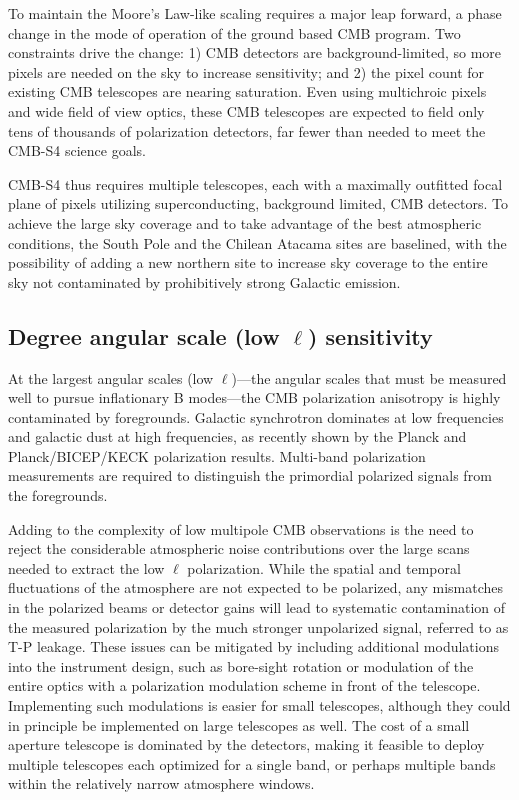 To maintain the Moore's Law-like scaling requires a major leap forward, a phase change in the mode of operation of the ground based CMB program.  Two constraints drive the change:  1) CMB detectors are background-limited, so more pixels are needed on the sky to increase sensitivity; and 2) the pixel count for existing CMB telescopes are nearing saturation.  Even using multichroic pixels and wide field of view optics, these CMB telescopes are expected to field only tens of thousands of polarization detectors, far fewer than needed to meet the CMB-S4 science goals. 

CMB-S4 thus requires multiple telescopes, each with a maximally outfitted focal plane of pixels utilizing superconducting, background limited, CMB detectors. To achieve the large sky coverage and to take advantage of the best atmospheric conditions, the South Pole and the Chilean Atacama sites are baselined, with the possibility of adding a new northern site to increase sky coverage to the entire sky not contaminated by prohibitively strong Galactic emission.

\subsection{Degree angular scale (low $\ell$) sensitivity}

At the largest angular scales (low $\ell$)---the angular scales that must be measured well to pursue inflationary 
B modes---the CMB polarization anisotropy is highly contaminated by foregrounds. Galactic synchrotron dominates at low frequencies and galactic dust at high frequencies, as recently shown by the Planck and Planck/BICEP/KECK polarization results. Multi-band polarization measurements are required to distinguish the primordial polarized signals from the foregrounds. 

Adding to the complexity of low multipole CMB observations is the need to reject the considerable atmospheric noise contributions over the large scans needed to extract the low 
$\ell$ polarization. While the spatial and temporal fluctuations of the atmosphere are not expected to be polarized, any mismatches in the polarized beams or detector gains will lead to systematic contamination of the measured polarization by the much stronger unpolarized signal, referred to as T-P leakage. These issues can be mitigated by including additional modulations into the instrument design, such as bore-sight rotation or modulation of the entire optics with a polarization modulation scheme in front of the telescope. Implementing such modulations is easier for small telescopes, although they could in principle be implemented on large telescopes as well. The cost of a small aperture telescope is dominated by the detectors, making it feasible to deploy multiple telescopes each optimized for a single band, or perhaps multiple bands within the relatively narrow atmosphere windows.

